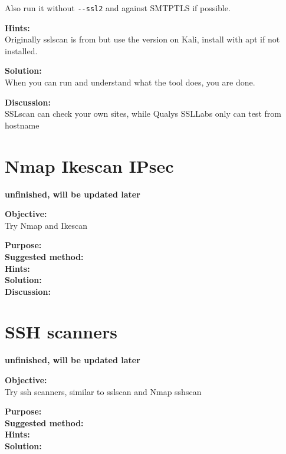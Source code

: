 \documentclass[a4paper,11pt,notitlepage]{report}
\begin{document}
Also run it without \verb+--ssl2+ and against SMTPTLS if possible.

{\bf Hints:}\\
Originally sslscan is from  but use the version on Kali, install with apt if not installed.

{\bf Solution:}\\
When you can run and understand what the tool does, you are done.

{\bf Discussion:}\\
SSLscan can check your own sites, while Qualys SSLLabs only can test from hostname



\chapter{Nmap Ikescan IPsec}
\label{ex:nmap-ikescan}

{\bf unfinished, will be updated later}

{\bf Objective:}\\
Try Nmap and Ikescan

{\bf Purpose:}\\


{\bf Suggested method:}\\


{\bf Hints:}\\


{\bf Solution:}\\


{\bf Discussion:}\\


\chapter{SSH scanners}
\label{ex:nmap-ssh-scanner}

{\bf unfinished, will be updated later}

{\bf Objective:}\\

 Try ssh scanners, similar to sslscan and Nmap sshscan

{\bf Purpose:}\\


{\bf Suggested method:}\\


{\bf Hints:}\\


{\bf Solution:}\\
\end{document}
